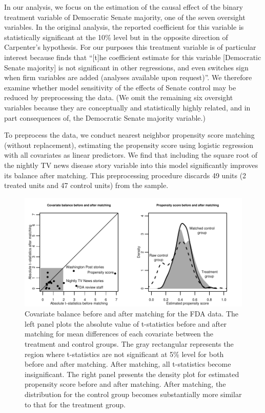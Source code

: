 \documentclass[11pt,titlepage]{article}
\begin{document}
In our analysis, we focus on the estimation of the causal effect of
the binary treatment variable of Democratic Senate majority, one of
the seven oversight variables. In the original analysis, the reported
coefficient for this variable is statistically significant at the 10\%
level but in the opposite direction of Carpenter's hypothesis.  For
our purposes this treatment variable is of particular interest because
\citet[p.498][]{Carp02} finds that ``[t]he coefficient estimate for
this variable [Democratic Senate majority] is not significant in other
regressions, and even switches sign when firm variables are added
(analyses available upon request)''.  We therefore examine whether
model sensitivity of the effects of Senate control may be reduced by
preprocessing the data.  (We omit the remaining six oversight
variables because they are conceptually and statistically highly
related, and in part consequences of, the Democratic Senate majority
variable.)

To preprocess the data, we conduct nearest neighbor propensity score
matching (without replacement), estimating the propensity score using
logistic regression with all covariates as linear predictors. We find
that including the square root of the nightly TV news disease story
variable into this model significantly improves its balance after
matching. This preprocessing procedure discards 49 units (2 treated
units and 47 control units) from the sample.

\begin{figure}[t] 
 \begin{center}
   \includegraphics{figs/fdabal.pdf}
  \end{center}
  \vspace{-0.275in}
  \caption{Covariate balance before and after matching for the FDA data.
    The left panel plots the absolute value of t-statistics before and
    after matching for mean differences of each covariate between the
    treatment and control groups. The gray rectangular represents the
    region where t-statistics are not significant at 5\% level for
    both before and after matching. After matching, all t-statistics
    become insignificant. The right panel presents the density plot
    for estimated propensity score before and after matching. After
    matching, the distribution for the control group becomes
    substantially more similar to that for the treatment group.}
  \label{fg:fdabal}
\end{figure}
\end{document}
